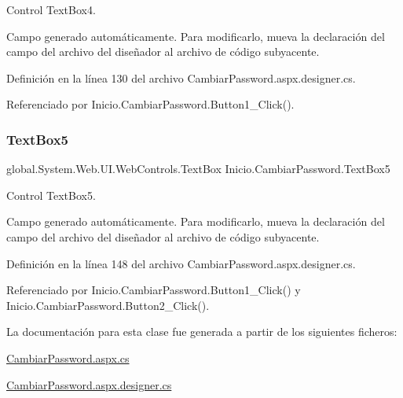 Control Text\+Box4. 

Campo generado automáticamente. Para modificarlo, mueva la declaración del campo del archivo del diseñador al archivo de código subyacente. 

Definición en la línea 130 del archivo Cambiar\+Password.\+aspx.\+designer.\+cs.



Referenciado por Inicio.\+Cambiar\+Password.\+Button1\+\_\+\+Click().

\mbox{\label{classInicio_1_1CambiarPassword_a852585bbaa846d9076125c13ca2ad786}} 
\subsubsection{\texorpdfstring{TextBox5}{TextBox5}}
{\footnotesize\ttfamily global.\+System.\+Web.\+U\+I.\+Web\+Controls.\+Text\+Box Inicio.\+Cambiar\+Password.\+Text\+Box5\hspace{0.3cm}{\ttfamily [protected]}}



Control Text\+Box5. 

Campo generado automáticamente. Para modificarlo, mueva la declaración del campo del archivo del diseñador al archivo de código subyacente. 

Definición en la línea 148 del archivo Cambiar\+Password.\+aspx.\+designer.\+cs.



Referenciado por Inicio.\+Cambiar\+Password.\+Button1\+\_\+\+Click() y Inicio.\+Cambiar\+Password.\+Button2\+\_\+\+Click().



La documentación para esta clase fue generada a partir de los siguientes ficheros\+:\begin{DoxyCompactItemize}
\item 
\mbox{\hyperlink{CambiarPassword_8aspx_8cs}{Cambiar\+Password.\+aspx.\+cs}}\item 
\mbox{\hyperlink{CambiarPassword_8aspx_8designer_8cs}{Cambiar\+Password.\+aspx.\+designer.\+cs}}\end{DoxyCompactItemize}
